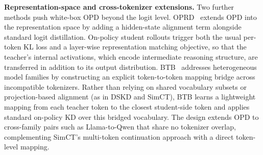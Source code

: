\documentclass{article} %
\begin{document}
\textbf{Representation-space and cross-tokenizer extensions.} Two further methods push white-box OPD beyond the logit level. OPRD~\citep{2606.06021} extends OPD into the representation space by adding a hidden-state alignment term alongside standard logit distillation. On-policy student rollouts trigger both the usual per-token KL loss and a layer-wise representation matching objective, so that the teacher's internal activations, which encode intermediate reasoning structure, are transferred in addition to its output distribution. BTB~\citep{2606.09456} addresses heterogeneous model families by constructing an explicit token-to-token mapping bridge across incompatible tokenizers. Rather than relying on shared vocabulary subsets or projection-based alignment (as in DSKD and SimCT), BTB learns a lightweight mapping from each teacher token to the closest student-side token and applies standard on-policy KD over this bridged vocabulary. The design extends OPD to cross-family pairs such as Llama-to-Qwen that share no tokenizer overlap, complementing SimCT's multi-token continuation approach with a direct token-level mapping.
\end{document}
